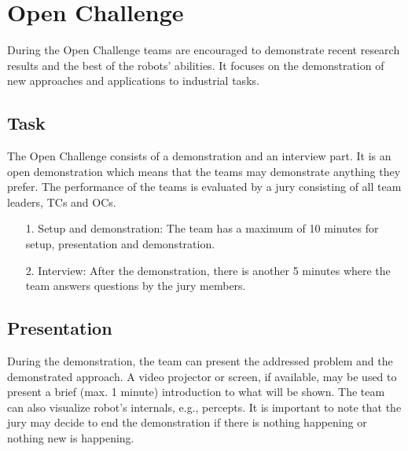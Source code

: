 



\newpage
\section{Open Challenge}
During the Open Challenge teams are encouraged to demonstrate recent research results and the best of the robots’ abilities. It focuses on the demonstration of new approaches and applications to industrial tasks.

\subsection{Task}

The Open Challenge consists of a demonstration and an interview part. It is an open demonstration which means that the teams may demonstrate anything they prefer. The performance of the teams is evaluated by a jury consisting of all team leaders, TCs and OCs.
\begin{itemize}

\item[1.] Setup and demonstration: The team has a maximum of 10 minutes for setup, presentation and demonstration.
\item[2.] Interview: After the demonstration, there is another 5 minutes where the team answers questions by the jury members.
\end{itemize}

\subsection{Presentation}
During the demonstration, the team can present the addressed problem and the demonstrated approach.
A video projector or screen, if available, may be used to present a brief (max. 1 minute) introduction to what will be shown. The team can also visualize robot’s internals, e.g., percepts. It is important to note that the jury may decide to end the demonstration if there is nothing happening or nothing new is happening.

